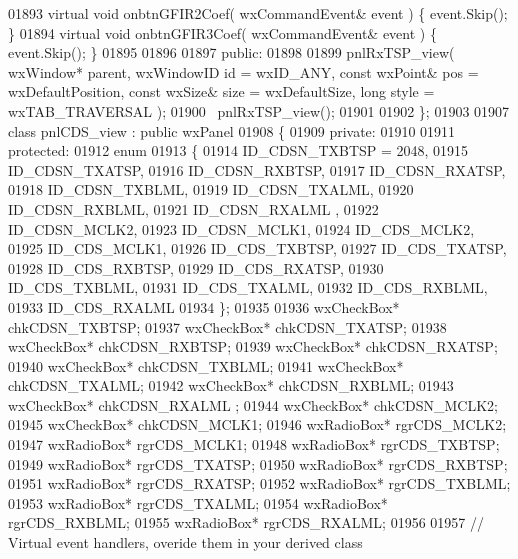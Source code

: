 \begin{DoxyCode}
01893         \textcolor{keyword}{virtual} \textcolor{keywordtype}{void} onbtnGFIR2Coef( wxCommandEvent& event ) \{ \textcolor{keyword}{event}.Skip(); \}
01894         \textcolor{keyword}{virtual} \textcolor{keywordtype}{void} onbtnGFIR3Coef( wxCommandEvent& event ) \{ \textcolor{keyword}{event}.Skip(); \}
01895         
01896     
01897     \textcolor{keyword}{public}:
01898         
01899         pnlRxTSP_view( wxWindow* parent, wxWindowID \textcolor{keywordtype}{id} = wxID\_ANY, \textcolor{keyword}{const} wxPoint& pos = wxDefaultPosition, \textcolor{keyword}{
      const} wxSize& size = wxDefaultSize, \textcolor{keywordtype}{long} style = wxTAB\_TRAVERSAL ); 
01900         ~pnlRxTSP_view();
01901     
01902 \};
01903 
01907 \textcolor{keyword}{class }pnlCDS_view : \textcolor{keyword}{public} wxPanel 
01908 \{
01909     \textcolor{keyword}{private}:
01910     
01911     \textcolor{keyword}{protected}:
01912         \textcolor{keyword}{enum}
01913         \{
01914             ID\_CDSN\_TXBTSP = 2048,
01915             ID_CDSN_TXATSP,
01916             ID_CDSN_RXBTSP,
01917             ID_CDSN_RXATSP,
01918             ID_CDSN_TXBLML,
01919             ID_CDSN_TXALML,
01920             ID_CDSN_RXBLML,
01921             ID_CDSN_RXALML ,
01922             ID_CDSN_MCLK2,
01923             ID_CDSN_MCLK1,
01924             ID_CDS_MCLK2,
01925             ID_CDS_MCLK1,
01926             ID_CDS_TXBTSP,
01927             ID_CDS_TXATSP,
01928             ID_CDS_RXBTSP,
01929             ID_CDS_RXATSP,
01930             ID_CDS_TXBLML,
01931             ID_CDS_TXALML,
01932             ID_CDS_RXBLML,
01933             ID\_CDS\_RXALML
01934         \};
01935         
01936         wxCheckBox* chkCDSN_TXBTSP;
01937         wxCheckBox* chkCDSN_TXATSP;
01938         wxCheckBox* chkCDSN_RXBTSP;
01939         wxCheckBox* chkCDSN_RXATSP;
01940         wxCheckBox* chkCDSN_TXBLML;
01941         wxCheckBox* chkCDSN_TXALML;
01942         wxCheckBox* chkCDSN_RXBLML;
01943         wxCheckBox* chkCDSN_RXALML ;
01944         wxCheckBox* chkCDSN_MCLK2;
01945         wxCheckBox* chkCDSN_MCLK1;
01946         wxRadioBox* rgrCDS_MCLK2;
01947         wxRadioBox* rgrCDS_MCLK1;
01948         wxRadioBox* rgrCDS_TXBTSP;
01949         wxRadioBox* rgrCDS_TXATSP;
01950         wxRadioBox* rgrCDS_RXBTSP;
01951         wxRadioBox* rgrCDS_RXATSP;
01952         wxRadioBox* rgrCDS_TXBLML;
01953         wxRadioBox* rgrCDS_TXALML;
01954         wxRadioBox* rgrCDS_RXBLML;
01955         wxRadioBox* rgrCDS_RXALML;
01956         
01957         \textcolor{comment}{// Virtual event handlers, overide them in your derived class}

\end{DoxyCode}
